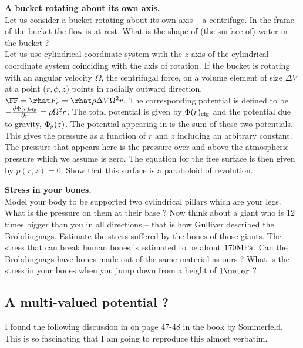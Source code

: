 \documentclass{tufte-book} %
\begin{document}
\begin{Exercise}
\Question
\label{prb2.1}
{\bf A bucket rotating about its own axis.}\\
Let us consider a bucket rotating about its own axis -- a
centrifuge. In the frame of the bucket the flow is at rest. What is
the shape of (the surface of) water in the bucket ? \\
Let us use cylindrical coordinate system with the $z$ axis of the
cylindrical coordinate system coinciding with the axis of rotation. 
If the bucket is rotating with an angular velocity $\Omega$, the
centrifugal force, on a volume element of size $\Delta V$ at a 
point ($r,\phi,z$) points in radially outward direction, 
$\FF = \rhat F_{r} = \rhat \rho\Delta V \Omega^2r$. The corresponding
potential is defined to be 
$-\frac{\partial\Phi(r)_{\rm cfg}}{\partial r} =   \rho\Omega^2r$.
The total potential is given by $\Phi(r)_{\rm cfg}$ and the potential
due to gravity, $\Phi_{\rm g}(z)$. The potential appearing in  
  is the sum of these two potentials.  This gives the
 pressure as a function of $r$ and $z$ including an arbitrary
 constant. The pressure that appears here is the pressure over and
 above the atmospheric pressure which we assume is zero. The equation
 for the free surface is then given by $p(r,z) = 0$. Show that this
 surface is a paraboloid of revolution. 

% 
\Question
{\bf Stress in your bones.} \\
Model your body to be supported two cylindrical pillars which are your
legs. What is the pressure on them at their base ? Now think about a
giant who is $12$ times bigger than you in all directions -- that is
how Gulliver described the Brobdingnags. Estimate the stress suffered
by the bones of those giants. The stress that can break human bones is
estimated to be about $170 {\rm M Pa}$. Can the Brobdingnags have
bones made out of the same material as ours ? What is the stress in
your bones when you jump down from a height of $1\meter$ ?  
\end{Exercise}
\subsection{A multi-valued potential ?}
\label{sec:multi}
I found the following discussion in on page 47-48 in the book by
Sommerfeld\cite{SomII06}. This is so fascinating that I am
going to reproduce this almost verbatim. 
\end{document}
